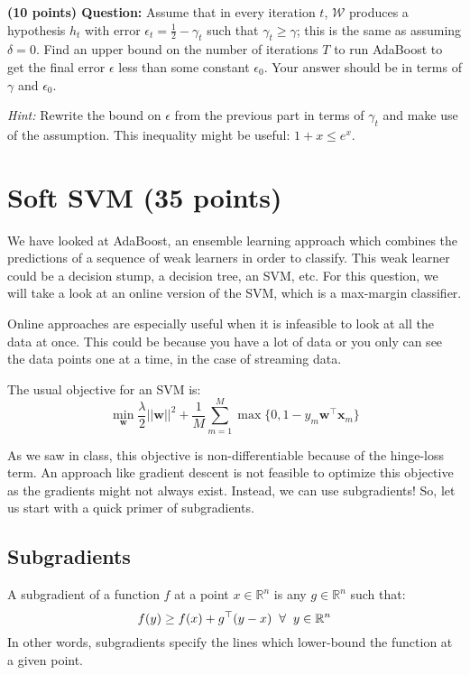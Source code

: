 \documentclass{article}
\begin{document}
\noindent \textbf{(10 points) Question:}
Assume that in every iteration $t$, $\mathcal{W}$ produces a hypothesis $h_t$ with error $\epsilon_t = \frac{1}{2} - \gamma_t$ such that $\gamma_t \geq \gamma$; this is the same as assuming $\delta = 0$. Find an upper bound on the number of iterations $T$ to run AdaBoost to get the final error $\epsilon$ less than some constant $\epsilon_0$. Your answer should be in terms of $\gamma$ and $\epsilon_0$. 

\noindent \textit{Hint:} Rewrite the bound on $\epsilon$ from the previous part in terms of $\gamma_t$ and make use of the assumption. This inequality might be useful: $1+x \leq e^x$.


\section{Soft SVM (35 points)}
We have looked at AdaBoost, an ensemble learning approach which combines the predictions of a sequence of weak learners in order to classify.
This weak learner could be a decision stump, a decision tree, an SVM, etc. For this question, we will take a look at an online version of the SVM, which is a max-margin classifier.

Online approaches are especially useful when it is infeasible to look at all the data at once.
This could be because you have a lot of data or you only can see the data points one at a time, in the case of streaming data.

The usual objective for an SVM is:
$$\min_\mathbf{w} \dfrac{\lambda}{2}||\mathbf{w}||^2 + \dfrac{1}{M} \sum\limits_{m=1}^M \max\{0, 1 - y_m \mathbf{w}^{\top} \mathbf{x}_m\}$$

As we saw in class, this objective is non-differentiable because of the hinge-loss term.
An approach like gradient descent is not feasible to optimize this objective as the gradients might not always exist.
Instead, we can use subgradients!
So, let us start with a quick primer of subgradients. 

\subsection{Subgradients}
A subgradient of a function $f$ at a point $x \in \mathbb{R}^n$ is any $g \in \mathbb{R}^n$ such that:
$$f(y) \geq f(x) + g^{\top} (y-x) \hspace{2mm} \forall \hspace{2mm} y \in \mathbb{R}^n$$
In other words, subgradients specify the lines which lower-bound the function at a given point.
\end{document}
